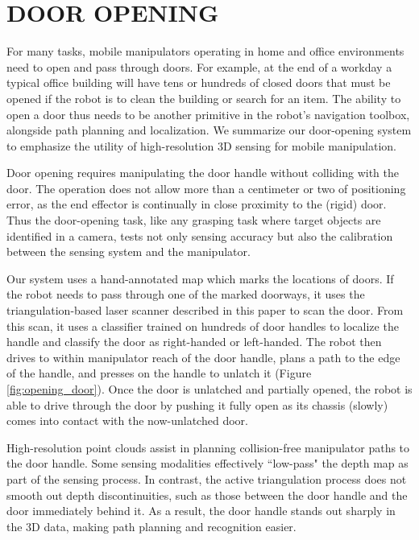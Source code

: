 \documentclass[letterpaper, 10 pt, conference]{ieeeconf}  %
\begin{document}
\section{DOOR OPENING}

For many tasks, mobile manipulators operating in home and office environments
need to open and pass through doors. For example, at the end of a workday a
typical office building will have tens or hundreds of closed doors that must be
opened if the robot is to clean the building or search for an item. The ability
to open a door thus needs to be another primitive in the robot's navigation
toolbox, alongside path planning and localization. We summarize our
door-opening system to emphasize the utility of high-resolution 3D sensing for
mobile manipulation.

Door opening requires manipulating the door handle without colliding with the
door. The operation does not allow more than a centimeter or two of positioning
error, as the end effector is continually in close proximity to the (rigid)
door. Thus the door-opening task, like any grasping task where target objects
are identified in a camera, tests not only sensing accuracy but also the
calibration between the sensing system and the manipulator.

Our system uses a hand-annotated map which marks the locations of doors. If the
robot needs to pass through one of the marked doorways, it uses the
triangulation-based laser scanner described in this paper to scan the door.
From this scan, it uses a classifier trained on hundreds of door handles to
localize the handle and classify the door as right-handed or left-handed.  The
robot then drives to within manipulator reach of the door handle, plans a path
to the edge of the handle, and presses on the handle to unlatch it
(Figure \ref{fig:opening_door}). Once the door is unlatched and partially
opened, the robot is able to drive through the door by pushing it fully 
open as its chassis (slowly) comes into contact with the now-unlatched door.

High-resolution point clouds assist in planning collision-free manipulator
paths to the door handle. Some sensing modalities effectively ``low-pass" the
depth map as part of the sensing process. In contrast, the active triangulation
process does not smooth out depth discontinuities, such as those between the
door handle and the door immediately behind it. As a result, the door handle
stands out sharply in the 3D data, making path planning and recognition easier.
\end{document}
